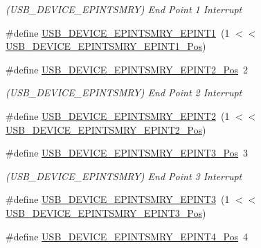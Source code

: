 \begin{DoxyCompactItemize}
\begin{DoxyCompactList}\small\item\em (U\+S\+B\+\_\+\+D\+E\+V\+I\+C\+E\+\_\+\+E\+P\+I\+N\+T\+S\+M\+RY) End Point 1 Interrupt \end{DoxyCompactList}\item 
\#define \mbox{\hyperlink{group___s_a_m_d21___u_s_b_gad906b52ff36504c59af8a48ad2ef2c76}{U\+S\+B\+\_\+\+D\+E\+V\+I\+C\+E\+\_\+\+E\+P\+I\+N\+T\+S\+M\+R\+Y\+\_\+\+E\+P\+I\+N\+T1}}~(1 $<$$<$ \mbox{\hyperlink{group___s_a_m_d21___u_s_b_ga9aec51b5c534b1e33e18a4cf3dd67fab}{U\+S\+B\+\_\+\+D\+E\+V\+I\+C\+E\+\_\+\+E\+P\+I\+N\+T\+S\+M\+R\+Y\+\_\+\+E\+P\+I\+N\+T1\+\_\+\+Pos}})
\item 
\#define \mbox{\hyperlink{group___s_a_m_d21___u_s_b_ga2819777cab6b374670d365d26af7c0d7}{U\+S\+B\+\_\+\+D\+E\+V\+I\+C\+E\+\_\+\+E\+P\+I\+N\+T\+S\+M\+R\+Y\+\_\+\+E\+P\+I\+N\+T2\+\_\+\+Pos}}~2
\begin{DoxyCompactList}\small\item\em (U\+S\+B\+\_\+\+D\+E\+V\+I\+C\+E\+\_\+\+E\+P\+I\+N\+T\+S\+M\+RY) End Point 2 Interrupt \end{DoxyCompactList}\item 
\#define \mbox{\hyperlink{group___s_a_m_d21___u_s_b_gafec0747f94f8d9f10208e1bc4c61f2ae}{U\+S\+B\+\_\+\+D\+E\+V\+I\+C\+E\+\_\+\+E\+P\+I\+N\+T\+S\+M\+R\+Y\+\_\+\+E\+P\+I\+N\+T2}}~(1 $<$$<$ \mbox{\hyperlink{group___s_a_m_d21___u_s_b_ga2819777cab6b374670d365d26af7c0d7}{U\+S\+B\+\_\+\+D\+E\+V\+I\+C\+E\+\_\+\+E\+P\+I\+N\+T\+S\+M\+R\+Y\+\_\+\+E\+P\+I\+N\+T2\+\_\+\+Pos}})
\item 
\#define \mbox{\hyperlink{group___s_a_m_d21___u_s_b_ga954b3c4af55fccee83598255fc7a8dad}{U\+S\+B\+\_\+\+D\+E\+V\+I\+C\+E\+\_\+\+E\+P\+I\+N\+T\+S\+M\+R\+Y\+\_\+\+E\+P\+I\+N\+T3\+\_\+\+Pos}}~3
\begin{DoxyCompactList}\small\item\em (U\+S\+B\+\_\+\+D\+E\+V\+I\+C\+E\+\_\+\+E\+P\+I\+N\+T\+S\+M\+RY) End Point 3 Interrupt \end{DoxyCompactList}\item 
\#define \mbox{\hyperlink{group___s_a_m_d21___u_s_b_ga747e0d44bfa4279a88220d66183167dc}{U\+S\+B\+\_\+\+D\+E\+V\+I\+C\+E\+\_\+\+E\+P\+I\+N\+T\+S\+M\+R\+Y\+\_\+\+E\+P\+I\+N\+T3}}~(1 $<$$<$ \mbox{\hyperlink{group___s_a_m_d21___u_s_b_ga954b3c4af55fccee83598255fc7a8dad}{U\+S\+B\+\_\+\+D\+E\+V\+I\+C\+E\+\_\+\+E\+P\+I\+N\+T\+S\+M\+R\+Y\+\_\+\+E\+P\+I\+N\+T3\+\_\+\+Pos}})
\item 
\#define \mbox{\hyperlink{group___s_a_m_d21___u_s_b_gacd65c192a664ec0c792e39cf4a1d0364}{U\+S\+B\+\_\+\+D\+E\+V\+I\+C\+E\+\_\+\+E\+P\+I\+N\+T\+S\+M\+R\+Y\+\_\+\+E\+P\+I\+N\+T4\+\_\+\+Pos}}~4
$$
\end{DoxyCompactItemize}
